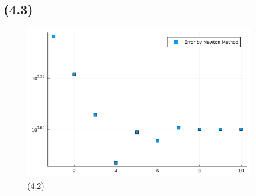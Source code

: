 \documentclass[uplatex, dvipdfmx, a4j,11pt]{jsarticle}
\begin{document}
\subsection*{(4.3)}
\begin{figure}[h]
  \begin{center}
    \includegraphics[width=100mm]{newton_error.png}
    \caption{(4.2)}
  \end{center}
\end{figure}
\end{document}
